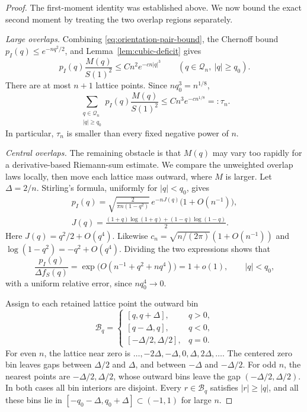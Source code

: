 \begin{proof}
The first-moment identity was established above. We now bound the exact
second moment by treating the two overlap regions separately.

\smallskip\noindent\emph{Large overlaps.}
Combining \eqref{eq:orientation-pair-bound}, the Chernoff bound
$p_I(q)\le e^{-nq^2/2}$, and Lemma~\ref{lem:cubic-deficit} gives
\[
 p_I(q)\frac{M(q)}{S(1)^2}
 \le Cn^2 e^{-cn|q|^3}
 \qquad(q\in\mathcal Q_n,\ |q|\ge q_0).
\]
There are at most $n+1$ lattice points. Since $nq_0^3=n^{1/8}$,
\begin{equation}
 \sum_{\substack{q\in\mathcal Q_n\\ |q|\ge q_0}}
       p_I(q)\frac{M(q)}{S(1)^2}
 \le Cn^3e^{-c n^{1/8}}=: \tau_n.
 \label{eq:orientation-tail}
\end{equation}
In particular, $\tau_n$ is smaller than every fixed negative power of $n$.

\smallskip\noindent\emph{Central overlaps.}
The remaining obstacle is that $M(q)$ may vary too rapidly for a
derivative-based Riemann-sum estimate. We compare the unweighted overlap
laws locally, then move each lattice mass outward, where $M$ is larger.
Let $\Delta=2/n$. Stirling's formula,
uniformly for $|q|<q_0$, gives
\begin{gather*}
 p_I(q)=
 \sqrt{\frac{2}{\pi n(1-q^2)}}\,
 e^{-nJ(q)}\bigl(1+O(n^{-1})\bigr),\\
 J(q)=\frac{(1+q)\log(1+q)+(1-q)\log(1-q)}2.
\end{gather*}
Here $J(q)=q^2/2+O(q^4)$.  Likewise
$c_n=\sqrt{n/(2\pi)}(1+O(n^{-1}))$ and
$\log(1-q^2)=-q^2+O(q^4)$.  Dividing the two expressions shows that
\begin{equation}
 \frac{p_I(q)}{\Delta f_S(q)}
 =\exp\!\bigl(O(n^{-1}+q^2+nq^4)\bigr)=1+o(1),
 \qquad |q|<q_0,
 \label{eq:orientation-local-density}
\end{equation}
with a uniform relative error, since $nq_0^4\to0$.

Assign to each retained lattice point the outward bin
\begin{equation}
 \mathcal B_q=
 \begin{cases}
 [q,q+\Delta],&q>0,\\
 [q-\Delta,q],&q<0,\\
 [-\Delta/2,\Delta/2],&q=0.
 \end{cases}
 \label{eq:orientation-bins}
\end{equation}
For even $n$, the lattice near zero is
$\ldots,-2\Delta,-\Delta,0,\Delta,2\Delta,\ldots$.
The centered zero bin leaves gaps between $\Delta/2$ and $\Delta$, and
between $-\Delta$ and $-\Delta/2$.
For odd $n$, the nearest points are $-\Delta/2,\Delta/2$, whose outward
bins leave the gap $(-\Delta/2,\Delta/2)$.
In both cases all bin interiors are disjoint.  Every $r\in\mathcal B_q$
satisfies $|r|\ge|q|$, and all these bins lie in
$[-q_0-\Delta,q_0+\Delta]\subset(-1,1)$ for large $n$.


\end{proof}
